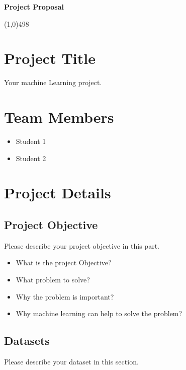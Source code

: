 \documentclass[11pt]{article}
\begin{document}
\begin{center}
{\Large \textbf{Project Proposal}}\\
\end{center}

\linethickness{1mm}\line(1,0){498}



\section{Project Title}

Your machine Learning project.

\section{Team Members}

\begin{itemize}
  \item Student 1
  \item Student 2
\end{itemize}

\section{Project Details}

\subsection{Project Objective}

Please describe your project objective in this part.

\begin{itemize}
  \item What is the project Objective?
  \item What problem to solve?
  \item Why the problem is important?
  \item Why machine learning can help to solve the problem?
\end{itemize}

\subsection{Datasets}

Please describe your dataset in this section.
\end{document}
